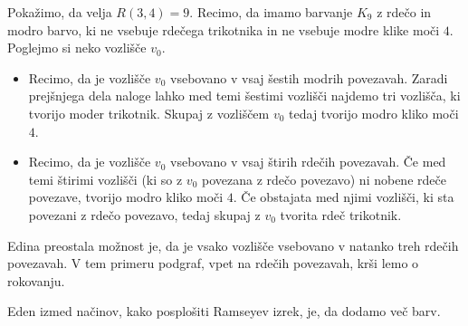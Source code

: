 \documentclass[twoside,11pt]{article}
\begin{document}
\begin{zgled}
    Pokažimo, da velja $R(3, 4) = 9$. Recimo, da imamo barvanje $K_9$ z rdečo in modro 
    barvo, ki ne vsebuje rdečega trikotnika in ne vsebuje modre klike moči $4$. Poglejmo 
    si neko vozlišče $v_0$. 
    \begin{itemize}
        \item Recimo, da je vozlišče $v_0$ vsebovano v vsaj šestih modrih povezavah. Zaradi 
        prejšnjega dela naloge lahko med temi šestimi vozlišči najdemo tri vozlišča,
        ki tvorijo moder trikotnik. Skupaj z vozliščem $v_0$ tedaj tvorijo modro kliko moči 
        $4$.

        \item Recimo, da je vozlišče $v_0$ vsebovano v vsaj štirih rdečih povezavah. Če 
        med temi štirimi vozlišči (ki so z $v_0$ povezana z rdečo povezavo) ni nobene 
        rdeče povezave, tvorijo modro kliko moči $4$. Če obstajata med njimi vozlišči, 
        ki sta povezani z rdečo povezavo, tedaj skupaj z $v_0$ tvorita rdeč trikotnik.
    \end{itemize}
    
    Edina preostala možnost je, da je vsako vozlišče vsebovano v natanko treh rdečih povezavah. 
    V tem primeru podgraf, vpet na rdečih povezavah, krši lemo o rokovanju.
\end{zgled}

Eden izmed načinov, kako posplošiti Ramseyev izrek, je, da dodamo več barv. 
\end{document}
